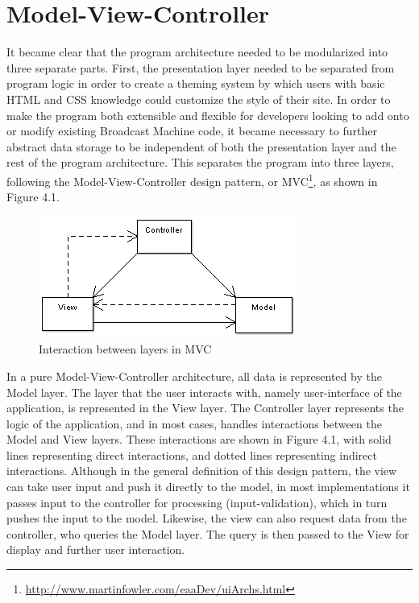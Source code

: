 \documentclass[a4paper,12pt]{report}
\begin{document}
\section{Model-View-Controller}
It became clear that the program architecture needed to be modularized into three separate parts. First, the presentation layer needed to 
be separated from program logic in order to create a theming system by which users with basic HTML and CSS knowledge could customize the style of their site. In order to make the program both extensible and flexible for developers looking to add onto or modify existing Broadcast Machine code, it became necessary to further abstract data storage to be independent of both the presentation layer and the rest of the program architecture. This separates the program into three layers, following the Model-View-Controller design pattern, or MVC\footnote{\url{http://www.martinfowler.com/eaaDev/uiArchs.html}}, as shown in Figure 4.1.


\begin{figure}[htp]
\begin{center}
\includegraphics[scale=0.6]{./images/mvc.png}
\end{center}
\caption{Interaction between layers in MVC}
\end{figure}
In a pure Model-View-Controller architecture, all data is represented by the Model layer. The layer that the user interacts with, namely user-interface of the application, is represented in the View layer. The Controller layer represents the logic of the application, and in most cases, handles interactions between the Model and View layers. These interactions are shown in Figure 4.1, with solid lines representing direct interactions, and dotted lines representing indirect interactions. Although in the general definition of this design pattern, the view can take user input and push it directly to the model, in most implementations it passes input to the controller for processing (input-validation), which in turn pushes the input to the model. Likewise, the view can also request data from the controller, who queries the Model layer. The query is then passed to the View for display and further user interaction.
\end{document}

